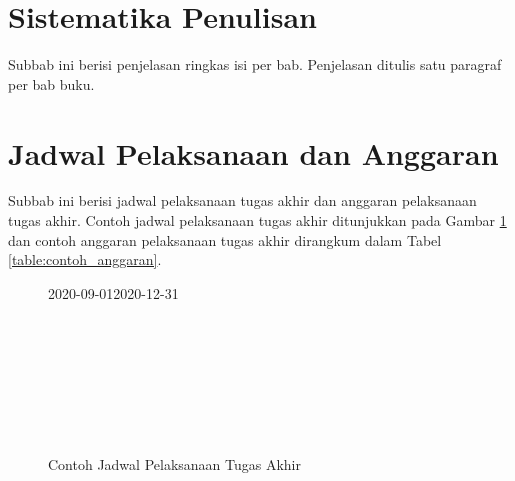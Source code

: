 \section{Sistematika Penulisan}

Subbab ini berisi penjelasan ringkas isi per bab. Penjelasan ditulis satu paragraf per bab buku.

\section{Jadwal Pelaksanaan dan Anggaran}

Subbab ini berisi jadwal pelaksanaan tugas akhir dan anggaran pelaksanaan tugas akhir. Contoh jadwal pelaksanaan tugas akhir ditunjukkan pada Gambar \ref{figure:contoh_jadwal_pelaksanaan} dan contoh anggaran pelaksanaan tugas akhir dirangkum dalam Tabel \ref{table:contoh_anggaran}.

\begin{figure}[ht]
	\small
	\centering
	\begin{ganttchart}[
		hgrid,
		vgrid,
		y unit chart=0.5cm,
		y unit title=0.6cm,
		title height=1,
		x unit=1mm,
		time slot format=isodate,
		time slot unit=day]{2020-09-01}{2020-12-31}
		 \\
		 \\
		 \\
		 \\
		 \\
		 \\
		 \\
		 \\
	\end{ganttchart}
	\caption{Contoh Jadwal Pelaksanaan Tugas Akhir}
	\label{figure:contoh_jadwal_pelaksanaan}
\end{figure}

